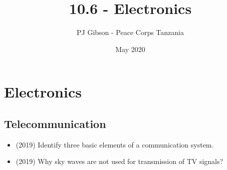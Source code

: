 \documentclass{article}
\title{10.6 - Electronics}
\author{PJ Gibson - Peace Corps Tanzania}
\date{May 2020}
\begin{document}
\maketitle


\section{Electronics}

\subsection{Telecommunication}
\begin{itemize}
\item (2019)  Identify three basic elements of a communication system. 
\item (2019)  Why sky waves are not used for transmission of TV signals? 
\end{itemize}
\end{document}
